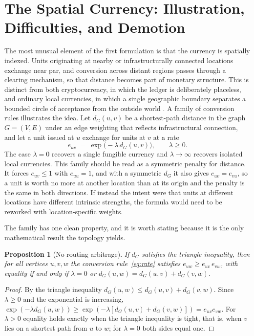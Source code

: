\documentclass[11pt]{article}
\newtheorem{proposition}{Proposition}
\theoremstyle{definition}
\begin{document}
\section{The Spatial Currency: Illustration, Difficulties, and Demotion}

The most unusual element of the first formulation is that the currency is spatially indexed. Units originating at nearby or infrastructurally connected locations exchange near par, and conversion across distant regions passes through a clearing mechanism, so that distance becomes part of monetary structure. This is distinct from both cryptocurrency, in which the ledger is deliberately placeless, and ordinary local currencies, in which a single geographic boundary separates a bounded circle of acceptance from the outside world \cite{blanc2011}. A family of conversion rules illustrates the idea. Let $d_G(u,v)$ be a shortest-path distance in the graph $G=(V,E)$ under an edge weighting that reflects infrastructural connection, and let a unit issued at $u$ exchange for units at $v$ at a rate
\begin{equation}
e_{uv} \;=\; \exp\!\bigl(-\lambda\, d_G(u,v)\bigr), \qquad \lambda\ge 0.
\label{eq:rate}
\end{equation}
The case $\lambda=0$ recovers a single fungible currency and $\lambda\to\infty$ recovers isolated local currencies. This family should be read as a symmetric penalty for distance. It forces $e_{uv}\le 1$ with $e_{uu}=1$, and with a symmetric $d_G$ it also gives $e_{uv}=e_{vu}$, so a unit is worth no more at another location than at its origin and the penalty is the same in both directions. If instead the intent were that units at different locations have different intrinsic strengths, the formula would need to be reworked with location-specific weights.

The family has one clean property, and it is worth stating because it is the only mathematical result the topology yields.

\begin{proposition}[No routing arbitrage]
If $d_G$ satisfies the triangle inequality, then for all vertices $u,v,w$ the conversion rule~\eqref{eq:rate} satisfies $e_{uw}\ge e_{uv}\,e_{vw}$, with equality if and only if $\lambda=0$ or $d_G(u,w)=d_G(u,v)+d_G(v,w)$.
\end{proposition}

\begin{proof}
By the triangle inequality $d_G(u,w)\le d_G(u,v)+d_G(v,w)$. Since $\lambda\ge 0$ and the exponential is increasing, $\exp(-\lambda d_G(u,w))\ge \exp(-\lambda[d_G(u,v)+d_G(v,w)]) = e_{uv}e_{vw}$. For $\lambda>0$ equality holds exactly when the triangle inequality is tight, that is, when $v$ lies on a shortest path from $u$ to $w$; for $\lambda=0$ both sides equal one.
\end{proof}
\end{document}
